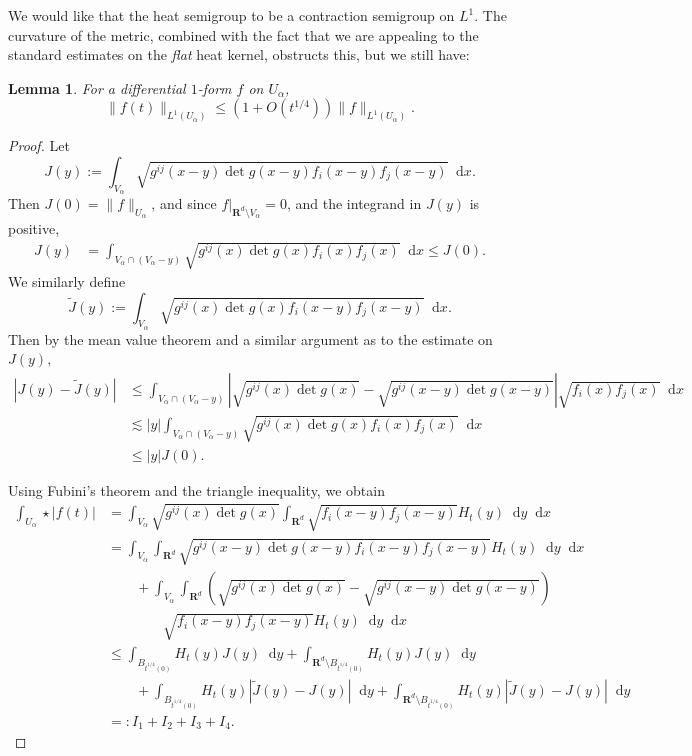 \documentclass[reqno,11pt]{amsart}
\newcommand{\RR}{\mathbf{R}}
\newcommand*\dif{\mathop{}\!\mathrm{d}}
\newtheorem{lemma}[theorem]{Lemma}
\theoremstyle{definition}
\numberwithin{equation}{section}
\begin{document}
We would like that the heat semigroup to be a contraction semigroup on $L^1$.
The curvature of the metric, combined with the fact that we are appealing to the standard estimates on the \emph{flat} heat kernel, obstructs this, but we still have:

\begin{lemma}
For a differential $1$-form $f$ on $U_\alpha$,
\begin{equation}\label{heat flow is contraction}
\|f(t)\|_{L^1(U_\alpha)} \leq (1 + O(t^{1/4})) \|f\|_{L^1(U_\alpha)}.
\end{equation}
\end{lemma}
\begin{proof}
Let 
$$J(y) := \int_{V_\alpha} \sqrt{g^{ij}(x - y) \det g(x - y) f_i(x - y) f_j(x - y)} \dif x.$$
Then $J(0) = \|f\|_{U_\alpha}$, and since $f|_{\RR^d \setminus V_\alpha} = 0$, and the integrand in $J(y)$ is positive,
\begin{align*}
J(y) 
&= \int_{V_\alpha \cap (V_\alpha - y)} \sqrt{g^{ij}(x) \det g(x) f_i(x) f_j(x)} \dif x 
\leq J(0).
\end{align*}
We similarly define 
$$\tilde J(y) := \int_{V_\alpha} \sqrt{g^{ij}(x) \det g(x) f_i(x - y) f_j(x - y)} \dif x.$$
Then by the mean value theorem and a similar argument as to the estimate on $J(y)$,
\begin{align*}
|J(y) - \tilde J(y)|
&\leq \int_{V_\alpha \cap (V_\alpha - y)} \left|\sqrt{g^{ij}(x) \det g(x)} - \sqrt{g^{ij}(x - y) \det g(x - y)}\right| \sqrt{f_i(x) f_j(x)} \dif x \\
&\lesssim |y| \int_{V_\alpha \cap (V_\alpha - y)} \sqrt{g^{ij}(x) \det g(x) f_i(x) f_j(x)} \dif x \\
&\leq |y| J(0).
\end{align*}

Using Fubini's theorem and the triangle inequality, we obtain
\begin{align*}
\int_{U_\alpha} \star |f(t)|
&= \int_{V_\alpha} \sqrt{g^{ij}(x) \det g(x)} \int_{\RR^d} \sqrt{f_i(x - y) f_j(x - y)} H_t(y) \dif y \dif x \\
&= \int_{V_\alpha} \int_{\RR^d} \sqrt{g^{ij}(x - y) \det g(x - y) f_i(x - y) f_j(x - y)} H_t(y) \dif y \dif x \\
&\qquad + \int_{V_\alpha} \int_{\RR^d} \left(\sqrt{g^{ij}(x) \det g(x)} - \sqrt{g^{ij}(x - y) \det g(x - y)}\right) \\
&\qquad \qquad \sqrt{f_i(x - y) f_j(x - y)} H_t(y) \dif y \dif x \\
&\leq \int_{B_{t^{1/4}(0)}} H_t(y) J(y) \dif y + \int_{\RR^d \setminus B_{t^{1/4}(0)}} H_t(y) J(y) \dif y \\
&\qquad + \int_{B_{t^{1/4}(0)}} H_t(y) |\tilde J(y) - J(y)| \dif y + \int_{\RR^d \setminus B_{t^{1/4}(0)}} H_t(y) |\tilde J(y) - J(y)| \dif y \\
&=: I_1 + I_2 + I_3 + I_4.
\end{align*}


\end{proof}
\end{document}
